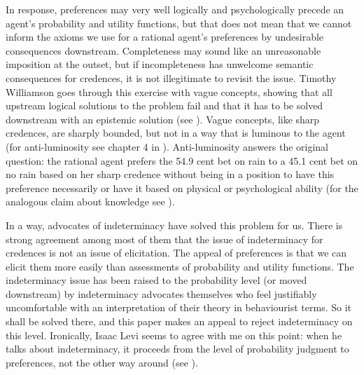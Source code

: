 \documentclass[11pt]{article}
\begin{document}
In response, preferences may very well logically and psychologically
precede an agent's probability and utility functions, but that does
not mean that we cannot inform the axioms we use for a rational
agent's preferences by undesirable consequences downstream.
Completeness may sound like an unreasonable imposition at the outset,
but if incompleteness has unwelcome semantic consequences for
credences, it is not illegitimate to revisit the issue. Timothy
Williamson goes through this exercise with vague concepts, showing
that all upstream logical solutions to the problem fail and that it
has to be solved downstream with an epistemic solution (see
). Vague concepts, like sharp credences, are
sharply bounded, but not in a way that is luminous to the agent (for
anti-luminosity see chapter 4 in ).
Anti-luminosity answers the original question: the rational agent
prefers the 54.9 cent bet on rain to a 45.1 cent bet on no rain based
on her sharp credence without being in a position to have this
preference necessarily or have it based on physical or psychological
ability (for the analogous claim about knowledge see
).

In a way, advocates of indeterminacy have solved this problem for us.
There is strong agreement among most of them that the issue of
indeterminacy for credences is not an issue of elicitation. The appeal
of preferences is that we can elicit them more easily than assessments
of probability and utility functions. The indeterminacy issue has been
raised to the probability level (or moved downstream) by indeterminacy
advocates themselves who feel justifiably uncomfortable with an
interpretation of their theory in behaviourist terms. So it shall be
solved there, and this paper makes an appeal to reject indeterminacy
on this level. Ironically, Isaac Levi seems to agree with me on this
point: when he talks about indeterminacy, it proceeds from the level
of probability judgment to preferences, not the other way around (see
).

\end{document}
